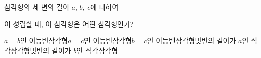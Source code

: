 삼각형의 세 변의 길이 $a$, $b$, $c$에 대하여\par\smallskip{}\par\smallskip\noindent 이 성립할 때, 이 삼각형은 어떤 삼각형인가?
\begin{choicesii}{$a=b$인 이등변삼각형}{$a=c$인 이등변삼각형}{$b=c$인 이등변삼각형}{빗변의 길이가 $a$인 직각삼각형}{빗변의 길이가 $b$인 직각삼각형}\end{choicesii}
